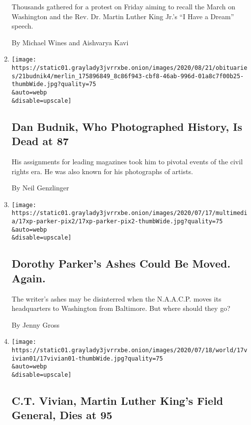\begin{enumerate}
  Thousands gathered for a protest on Friday aiming to recall the March
  on Washington and the Rev. Dr. Martin Luther King Jr.'s ``I Have a
  Dream'' speech.

  By Michael Wines and Aishvarya Kavi
\item
  \href{/2020/08/23/arts/dan-budnik-dead.html}{}

  \texttt{[image: https://static01.graylady3jvrrxbe.onion/images/2020/08/21/obituaries/21budnik4/merlin\_175896849\_8c86f943-cbf8-46ab-996d-01a8c7f00b25-thumbWide.jpg?quality=75\\\&auto=webp\\\&disable=upscale]}

  \hypertarget{dan-budnik-who-photographed-history-is-dead-at-87}{%
  \subsection{Dan Budnik, Who Photographed History, Is Dead at
  87}\label{dan-budnik-who-photographed-history-is-dead-at-87}}

  His assignments for leading magazines took him to pivotal events of
  the civil rights era. He was also known for his photographs of
  artists.

  By Neil Genzlinger
\item
  \href{/2020/07/19/us/dorothy-parker-ashes-baltimore.html}{}

  \texttt{[image: https://static01.graylady3jvrrxbe.onion/images/2020/07/17/multimedia/17xp-parker-pix2/17xp-parker-pix2-thumbWide.jpg?quality=75\\\&auto=webp\\\&disable=upscale]}

  \hypertarget{dorothy-parkers-ashes-could-be-moved-again}{%
  \subsection{Dorothy Parker's Ashes Could Be Moved.
  Again.}\label{dorothy-parkers-ashes-could-be-moved-again}}

  The writer's ashes may be disinterred when the N.A.A.C.P. moves its
  headquarters to Washington from Baltimore. But where should they go?

  By Jenny Gross
\item
  \href{/2020/07/17/us/ct-vivian-dead.html}{}

  \texttt{[image: https://static01.graylady3jvrrxbe.onion/images/2020/07/18/world/17vivian01/17vivian01-thumbWide.jpg?quality=75\\\&auto=webp\\\&disable=upscale]}

  \hypertarget{ct-vivian-martin-luther-kings-field-general-dies-at-95}{%
  \subsection{C.T. Vivian, Martin Luther King's Field General, Dies at
  95}\label{ct-vivian-martin-luther-kings-field-general-dies-at-95}}


\end{enumerate}
